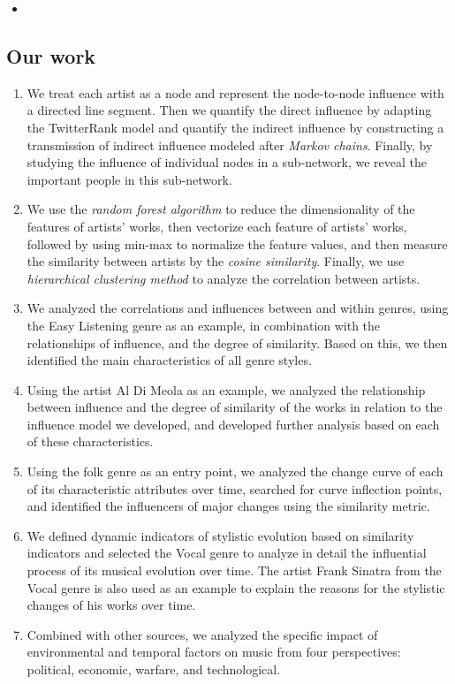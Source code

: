 \documentclass[12pt]{article}  %
\begin{document}
\begin{itemize}
	\setlength{\parsep}{0ex} %
	\setlength{\topsep}{2ex} %
	\setlength{\itemsep}{1ex} %
	\item 
\end{itemize}

\subsection{Our work}

\begin{enumerate}[\bfseries 1.]
	\setlength{\parsep}{0ex} %
	\setlength{\topsep}{2ex} %
	\setlength{\itemsep}{1ex} %
	\item We treat each artist as a node and represent the node-to-node influence with a directed line segment. Then we quantify the direct influence by adapting the TwitterRank model and quantify the indirect influence by constructing a transmission of indirect influence modeled after \textit{Markov chains}. Finally, by studying the influence of individual nodes in a sub-network, we reveal the important people in this sub-network. 
	\item We use the \textit{random forest algorithm} to reduce the dimensionality of the features of artists' works, then vectorize each feature of artists' works, followed by using min-max to normalize the feature values, and then measure the similarity between artists by the \textit{cosine similarity}. Finally, we use \textit{hierarchical clustering method} to analyze the correlation between artists.
	\item We analyzed the correlations and influences between and within genres, using the Easy Listening genre as an example, in combination with the relationships of influence, and the degree of similarity. Based on this, we then identified the main characteristics of all genre styles.
	\item Using the artist Al Di Meola as an example, we analyzed the relationship between influence and the degree of similarity of the works in relation to the influence model we developed, and developed further analysis based on each of these characteristics.
	\item Using the folk genre as an entry point, we analyzed the change curve of each of its characteristic attributes over time, searched for curve inflection points, and identified the influencers of major changes using the similarity metric.
	\item We defined dynamic indicators of stylistic evolution based on similarity indicators and selected the Vocal genre to analyze in detail the influential process of its musical evolution over time. The artist Frank Sinatra from the Vocal genre is also used as an example to explain the reasons for the stylistic changes of his works over time.
	\item Combined with other sources, we analyzed the specific impact of environmental and temporal factors on music from four perspectives: political, economic, warfare, and technological.
\end{enumerate}
\end{document}
